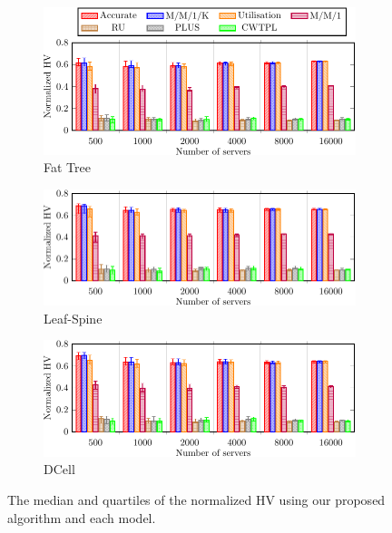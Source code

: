 \begin{figure}[t]
    \centering
    \begin{subfigure}[b]{0.9\linewidth}
        \includegraphics[width=\textwidth]{figures/graphs/models/fat_tree_hv-crop}
        \caption{Fat Tree}\vspace{.5em}
    \end{subfigure}
    \begin{subfigure}[b]{0.9\linewidth}
        \includegraphics[width=\textwidth]{figures/graphs/models/leaf_spine_hv-crop}
        \caption{Leaf-Spine}\vspace{.5em}
    \end{subfigure}
    \begin{subfigure}[b]{0.9\linewidth}
        \includegraphics[width=\textwidth]{figures/graphs/models/dcell_hv-crop}
        \caption{DCell}
    \end{subfigure}

    \caption{The median and quartiles of the normalized HV using our proposed algorithm and each model.}
    \label{fig:model_hv}
\end{figure}

